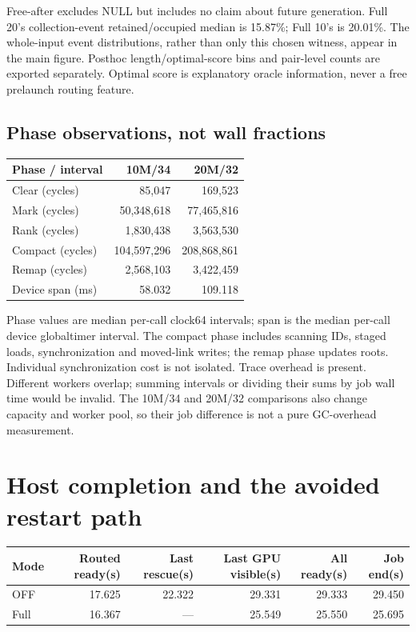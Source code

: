 \documentclass[11pt,a4paper]{article}
\begin{document}
Free-after excludes NULL but includes no claim about future generation. Full 20's collection-event retained/occupied median is 15.87\%; Full 10's is 20.01\%. The whole-input event distributions, rather than only this chosen witness, appear in the main figure. Posthoc length/optimal-score bins and pair-level counts are exported separately. Optimal score is explanatory oracle information, never a free prelaunch routing feature.

\subsection{Phase observations, not wall fractions}
\begin{center}\small\begin{tabular}{lrr}\toprule
Phase / interval & 10M/34 & 20M/32\\\midrule
Clear (cycles) & 85,047 & 169,523\\
Mark (cycles) & 50,348,618 & 77,465,816\\
Rank (cycles) & 1,830,438 & 3,563,530\\
Compact (cycles) & 104,597,296 & 208,868,861\\
Remap (cycles) & 2,568,103 & 3,422,459\\
Device span (ms) & 58.032 & 109.118\\
\bottomrule\end{tabular}\end{center}

Phase values are median per-call clock64 intervals; span is the median per-call device globaltimer interval. The compact phase includes scanning IDs, staged loads, synchronization and moved-link writes; the remap phase updates roots. Individual synchronization cost is not isolated. Trace overhead is present. Different workers overlap; summing intervals or dividing their sums by job wall time would be invalid. The 10M/34 and 20M/32 comparisons also change capacity and worker pool, so their job difference is not a pure GC-overhead measurement.

\section{Host completion and the avoided restart path}
\begin{center}\small\begin{tabular}{lrrrrr}\toprule
Mode & Routed ready(s) & Last rescue(s) & Last GPU visible(s) & All ready(s) & Job end(s)\\\midrule
OFF & 17.625 & 22.322 & 29.331 & 29.333 & 29.450\\
Full & 16.367 & --- & 25.549 & 25.550 & 25.695\\
\bottomrule\end{tabular}\end{center}
\end{document}
